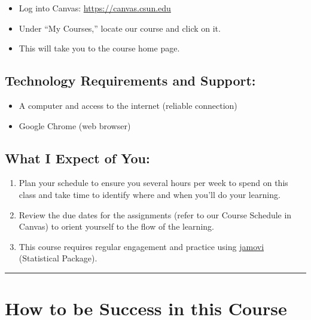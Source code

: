 \documentclass[11pt,]{article}
\providecommand{\tightlist}{%
  \setlength{\itemsep}{0pt}\setlength{\parskip}{0pt}}
\begin{document}
\begin{itemize}
\tightlist
\item
  Log into Canvas: \url{https://canvas.csun.edu}
\item
  Under ``My Courses,'' locate our course and click on it.
\item
  This will take you to the course home page.
\end{itemize}

\hypertarget{technology-requirements-and-support}{%
\subsection{Technology Requirements and
Support:}\label{technology-requirements-and-support}}

\begin{itemize}
\tightlist
\item
  A computer and access to the internet (reliable connection)
\item
  Google Chrome (web browser)
\end{itemize}

\hypertarget{what-i-expect-of-you}{%
\subsection{What I Expect of You:}\label{what-i-expect-of-you}}

\begin{enumerate}
\def\labelenumi{\arabic{enumi}.}
\tightlist
\item
  Plan your schedule to ensure you several hours per week to spend on
  this class and take time to identify where and when you'll do your
  learning.
\item
  Review the due dates for the assignments (refer to our Course Schedule
  in Canvas) to orient yourself to the flow of the learning.
\item
  This course requires regular engagement and practice using
  \protect\hyperlink{supplies}{jamovi} (Statistical Package).
\end{enumerate}

\begin{center}\rule{0.5\linewidth}{0.5pt}\end{center}

\hypertarget{how-to-be-success-in-this-course}{%
\section{How to be Success in this
Course}\label{how-to-be-success-in-this-course}}
\end{document}
